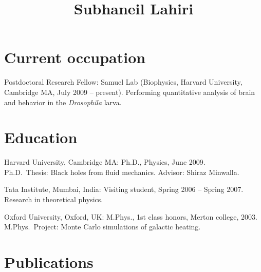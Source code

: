 \documentclass[letterpaper,10pt,notopicbreak,titleabove,plain]{simplecv}
\title{Subhaneil Lahiri}
\begin{document}
\pagestyle{empty}
\maketitle


\section{Current occupation}
\begin{topic}
\item[Postdoctoral Research Fellow:] Samuel Lab (Biophysics, Harvard University, Cambridge MA, July 2009 -- present). Performing quantitative analysis of brain and behavior in the \emph{Drosophila} larva.
\end{topic}

\section{Education}
\begin{topic}
  \item[Harvard University, Cambridge MA:] Ph.D., Physics, June 2009. \\
  Ph.D.\ Thesis: Black holes from fluid mechanics. Advisor: Shiraz Minwalla.%

  \item[Tata Institute, Mumbai, India:] Visiting student, Spring 2006 -- Spring 2007. Research in theoretical physics.

  \item[Oxford University, Oxford, UK:] M.Phys., 1st class honors, Merton college, 2003. \\
  M.Phys.\ Project: Monte Carlo simulations of galactic heating. %

\end{topic}

\section{Publications}
\nocite{Bhattacharya:2009gm,Bhattacharyya:2007vs,Lahiri:2007ae,Biswas:2006tj}


\end{document}
